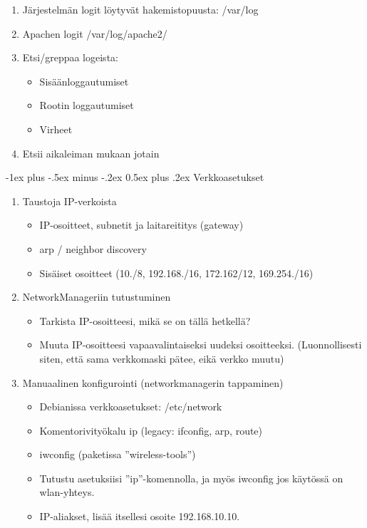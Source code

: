 \documentclass[12pt,portrait,a4]{article}
\makeatletter
\renewcommand{\section}{\@startsection{section}{1}{0mm}%
                                {-1ex plus -.5ex minus -.2ex}%
                                {0.5ex plus .2ex}%
                                {\normalfont\large\bfseries}}
\makeatother
\begin{document}
\begin{enumerate}
\item Järjestelmän logit löytyvät hakemistopuusta: /var/log
\item Apachen logit /var/log/apache2/
\item Etsi/greppaa logeista:
	\begin{itemize}
	\item Sisäänloggautumiset
	\item Rootin loggautumiset
	\item Virheet
	\end{itemize}
\item Etsii aikaleiman mukaan jotain
\end{enumerate}

\section{Verkkoasetukset}

\begin{enumerate}
\item Taustoja IP-verkoista
	\begin{itemize}
	\item IP-osoitteet, subnetit ja laitareititys (gateway)
	\item arp / neighbor discovery
	\item Sisäiset osoitteet (10./8, 192.168./16, 172.162/12, 169.254./16)
	\end{itemize}
\item NetworkManageriin tutustuminen
	\begin{itemize}
	\item Tarkista IP-osoitteesi, mikä se on tällä hetkellä?
	\item Muuta IP-osoitteesi vapaavalintaiseksi uudeksi osoitteeksi. (Luonnollisesti siten, että sama verkkomaski pätee, eikä verkko muutu)
	\end{itemize}
\item Manuaalinen konfigurointi (networkmanagerin tappaminen)
	\begin{itemize}
	\item Debianissa verkkoasetukset: /etc/network
	\item Komentorivityökalu ip (legacy: ifconfig, arp, route)
	\item iwconfig (paketissa ''wireless-tools'')
	\item Tutustu asetuksiisi ''ip''-komennolla, ja myös iwconfig jos
	käytössä on wlan-yhteys.
	\item IP-aliakset, lisää itsellesi osoite 192.168.10.10.
	\end{itemize}
\end{enumerate}
\end{document}

